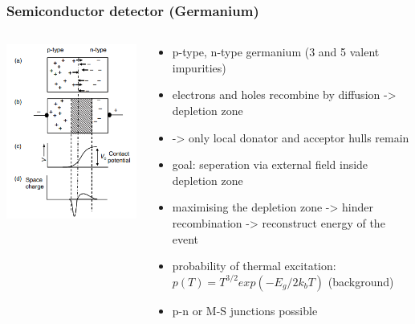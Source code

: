 \documentclass[aspectratio=1610, 12pt]{beamer}
\begin{document}
\begin{frame}\frametitle{Semiconductor detector (Germanium)}
  \begin{columns}
    \begin{column}[c]{0.48\textwidth}
      \includegraphics[width=\textwidth]{plots/junction.png}
    \end{column}
    \begin{column}[c]{0.48\textwidth}
      \begin{itemize}
        \item p-type, n-type germanium (3 and 5 valent impurities)
        \item electrons and holes recombine by diffusion -> depletion zone
        \item -> only local donator and acceptor hulls remain
        \item goal: seperation via external field inside depletion zone
        \item maximising the depletion zone -> hinder recombination -> reconstruct energy of the event
        \item probability of thermal excitation: $p(T) = T^{3/2} exp(-E_g / 2 k_b T)$ (background)
        \item p-n or M-S junctions possible
      \end{itemize}
    \end{column}
  \end{columns}
\end{frame}
\end{document}
